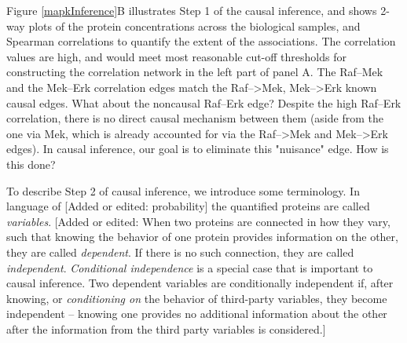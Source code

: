 \documentclass[journal=jacsat,manuscript=article]{achemso}
\def\added#1{{\color{magenta}[Added or edited: #1]}}
\begin{document}
Figure \ref{mapkInference}B illustrates Step 1 of the causal inference, and shows 2-way plots of the protein concentrations across the biological samples, and Spearman correlations to quantify the extent of the associations.  The correlation values are high, and would meet most reasonable cut-off thresholds for constructing the correlation network in the left part of panel A.  The Raf--Mek and the Mek--Erk correlation edges match the Raf-->Mek, Mek-->Erk known causal edges.  What about the noncausal Raf--Erk edge? Despite the high Raf--Erk correlation, there is no direct causal mechanism between them (aside from the one via Mek, which is already accounted for via the Raf-->Mek and Mek-->Erk edges).  In causal  inference, our goal is to eliminate this "nuisance" edge.  How is this done?

To describe Step 2 of causal inference, we introduce some terminology. In language of \added{probability} the quantified proteins are called {\it variables}. \added{When two proteins are connected in how they vary, such that knowing the behavior of one protein provides information on the other, they are called {\it dependent}.  If there is no such connection, they are called {\it independent}. {\it Conditional independence} is a special case that is important to causal inference.  Two dependent variables are conditionally independent if, after knowing, or {\it conditioning on} the behavior of third-party variables, they become independent -- knowing one provides no additional information about the other after the information from the third party variables is considered.}   
\end{document}
